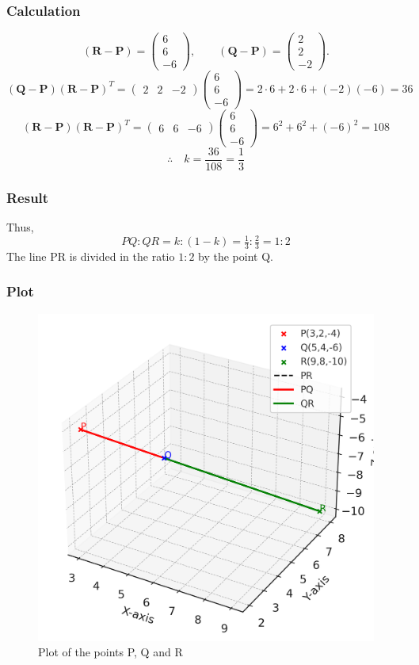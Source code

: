 \documentclass{beamer}
\providecommand{\brak}[1]{\ensuremath{\left(#1\right)}}
\theoremstyle{remark}
\newcommand{\myvec}[1]{\ensuremath{\begin{pmatrix}#1\end{pmatrix}}}
\numberwithin{equation}{section}
\begin{document}
\begin{frame}
\frametitle{Calculation}
\begin{equation}
\brak{\textbf{R}-\textbf{P}}=\myvec{6\\6\\-6},\qquad
\brak{\textbf{Q}-\textbf{P}}=\myvec{2\\2\\-2}.
\end{equation}
\begin{equation}
\brak{\mathbf{Q}-\mathbf{P}}\brak{\mathbf{R}-\mathbf{P}}^T
= \myvec{2 & 2 & -2}\myvec{6 \\ 6 \\ -6}
= 2\cdot 6 + 2\cdot 6 + (-2)(-6) 
= 36
\end{equation}
\begin{equation}
\brak{\mathbf{R}-\mathbf{P}}\brak{\mathbf{R}-\mathbf{P}}^T
= \myvec{6 & 6 & -6}\myvec{6 \\ 6 \\ -6}
= 6^2 + 6^2 + \brak{-6}^2
= 108
\end{equation}
\begin{equation}
\therefore \quad k = \frac{36}{108} = \frac{1}{3}
\end{equation}
\end{frame}

\begin{frame}
\frametitle{Result}
Thus,
\begin{equation}
 {P}{Q}:{Q}{R} = k:\brak{1-k} = \tfrac{1}{3}:\tfrac{2}{3} = 1:2
\end{equation}
The line PR is divided in the ratio $1 : 2$ by the point Q.
\end{frame}

\begin{frame}
\frametitle{Plot}
 \begin{figure}[h]
    \centering
    \includegraphics[width=0.5\linewidth]{figs/points_plot.png}
    \caption{Plot of the points P, Q and R}
\end{figure}   
\end{frame}
\end{document}
